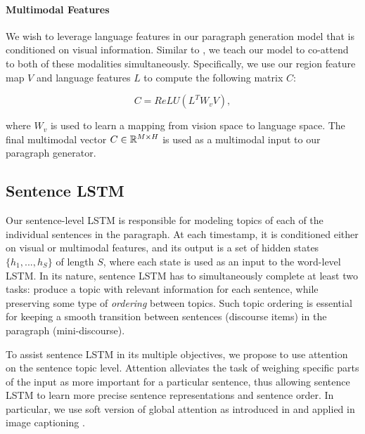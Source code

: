 \documentclass[11pt,a4paper]{article}
\newcommand{\R}{\mathbb{R}}
\begin{document}
\paragraph{Multimodal Features} We wish to leverage language features in our paragraph generation model that is conditioned on visual information.
Similar to \cite{vqaLU16}, we teach our model to co-attend to both of these modalities simultaneously.
Specifically, we use our region feature map $V$ and language features $L$ to compute the following matrix $C$:

\begin{equation}
    C = ReLU(L^TW_vV),
\end{equation}

where $W_v$ is used to learn a mapping from vision space to language space. The final multimodal vector $C \in \R\sp{M \times H}$ is used as a multimodal input to our paragraph generator.


\subsection{Sentence LSTM}
Our sentence-level LSTM is responsible for modeling topics of each of the individual sentences in the paragraph.
At each timestamp, it is conditioned either on visual or multimodal features, and its output is a set of hidden states $\{h_1, ..., h_S\}$ of length $S$, where each state is used as an input to the word-level LSTM.
In its nature, sentence LSTM has to simultaneously complete at least two tasks: produce a topic with relevant information for each sentence, while preserving some type of \textit{ordering} between topics.
Such topic ordering is essential for keeping a smooth transition between sentences (discourse items) in the paragraph (mini-discourse).

To assist sentence LSTM in its multiple objectives, we propose to use attention on the sentence topic level.
Attention alleviates the task of weighing specific parts of the input as more important for a particular sentence, thus allowing sentence LSTM to learn more precise sentence representations and sentence order.
In particular, we use soft version of global attention as introduced in \cite{bahdanau2014neural} and applied in image captioning \cite{xu2015attend,luong2015effective}.
\end{document}
